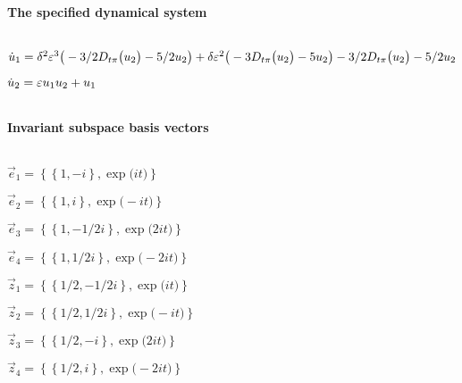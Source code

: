 
\(\)
\paragraph{The specified dynamical system}
\(
\)\par

\(\dot u_{1}=\delta ^{2} \varepsilon^{3} \big(-3/2 D_{t\pi }\big(u\sb2\big)-5/2 
u\sb2\big)+\delta  \varepsilon^{2} \big(-3 D_{t\pi }\big(u\sb2\big)-5 u\sb2
\big)-3/2 D_{t\pi }\big(u\sb2\big)-5/2 u\sb2
\)\par

\(\dot u_{2}=\varepsilon u\sb1 u\sb2+u\sb1
\)\par

\(\)
\paragraph{Invariant subspace basis vectors}
\(
\)\par

\(\vec e_{1}=\left\{
\left\{
1 , -i
\right\} , \exp \big(i t\big)
\right\}
\)\par

\(\vec e_{2}=\left\{
\left\{
1 , i
\right\} , \exp \big(-i t\big)
\right\}
\)\par

\(\vec e_{3}=\left\{
\left\{
1 , -1/2 i
\right\} , \exp \big(2 i t\big)
\right\}
\)\par

\(\vec e_{4}=\left\{
\left\{
1 , 1/2 i
\right\} , \exp \big(-2 i t\big)
\right\}
\)\par

\(\vec z_{1}=\left\{
\left\{
1/2 , -1/2 i
\right\} , \exp \big(i t\big)
\right\}
\)\par

\(\vec z_{2}=\left\{
\left\{
1/2 , 1/2 i
\right\} , \exp \big(-i t\big)
\right\}
\)\par

\(\vec z_{3}=\left\{
\left\{
1/2 , -i
\right\} , \exp \big(2 i t\big)
\right\}
\)\par

\(\vec z_{4}=\left\{
\left\{
1/2 , i
\right\} , \exp \big(-2 i t\big)
\right\}
\)\par
